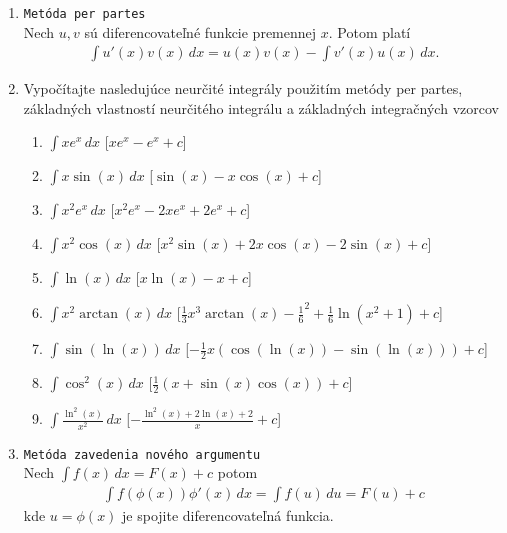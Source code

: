 \begin{enumerate}
\item \texttt{Metóda per partes} \\
Nech $u,v$ sú diferencovateľné funkcie premennej $x$. Potom platí
\begin{align*}
\int u'(x)v(x) \,dx=u(x)v(x)- \int v'(x)u(x) \,dx .
\end{align*}

\item Vypočítajte nasledujúce neurčité integrály použitím metódy per partes, základných vlastností neurčitého integrálu a základných integračných vzorcov
\begin{enumerate}
\item{$ \int xe^x \,dx$} \hspace{\fill} [$x e^x - e^x +c$]
\item{$ \int x\sin(x) \,dx$} \hspace{\fill} [$ \sin(x)- x \cos(x) +c$]
\item{$ \int x^2 e^x \,dx$} \hspace{\fill} [$x^2 e^x -2x e^x+2e^x +c$]
\item{$ \int x^2 \cos(x) \,dx$} \hspace{\fill} [$x^2 \sin (x) + 2 x \cos (x) - 2\sin (x) +c$]
\item{$ \int \ln(x) \,dx$} \hspace{\fill} [$ x \ln (x)-x+c$]
\item{$ \int x^2\arctan(x) \,dx$} \hspace{\fill} [$ \frac{1}{3}x^3\arctan(x)-\frac{1}{6}^2+\frac{1}{6}\ln(x^2+1)+c$]
\item{$ \int \sin(\ln(x)) \,dx$} \hspace{\fill} [$-\frac{1}{2}x(\cos(\ln(x))-\sin(\ln(x))) +c$]
\item{$\int  \cos^2(x) \,dx$} \hspace{\fill} [$ \frac{1}{2}(x+\sin(x)\cos(x))+c$]
\item{$ \int \frac{\ln^2(x)}{x^2} \,dx$} \hspace{\fill} [$ -\frac{\ln^2(x)+2\ln(x)+2}{x}+c$]
\end{enumerate}


\item \texttt{Metóda zavedenia nového argumentu} \\
Nech $\int f(x) \, dx=F(x)+c$ potom
\begin{align*}
\int f(\phi(x))\phi'(x) \, dx=\int f(u) \, du = F(u) +c
\end{align*}
kde $u=\phi(x)$ je spojite diferencovateľná funkcia.


\end{enumerate}

